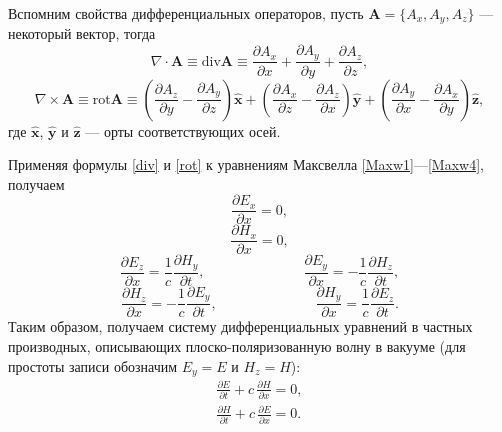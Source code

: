 \documentclass[12pt,a4paper]{article}
\begin{document}
	Вспомним свойства дифференциальных операторов, пусть $\mathbf{A} = \{A_x, A_y, A_z\}$ --- некоторый вектор, тогда
	\begin{equation}\label{div}
		\nabla \cdot \mathbf{A} \equiv \text{div}\mathbf{A} \equiv \frac{\partial A_x}{\partial x} + \frac{\partial A_y}{\partial y} + \frac{\partial A_z}{\partial z},
	\end{equation}
	\begin{equation}\label{rot}
		\nabla \times \mathbf{A} \equiv \text{rot}\mathbf{A} \equiv \left(\frac{\partial A_z}{\partial y} - \frac{\partial A_y}{\partial z}\right)\hat{\mathbf{x}} + \left(\frac{\partial A_x}{\partial z} - \frac{\partial A_z}{\partial x}\right)\hat{\mathbf{y}} + \left(\frac{\partial A_y}{\partial x} - \frac{\partial A_x}{\partial y}\right)\hat{\mathbf{z}},
	\end{equation}
	где $\hat{\mathbf{x}}$, $\hat{\mathbf{y}}$ и $\hat{\mathbf{z}}$ --- орты соответствующих осей.
	
	Применяя формулы \eqref{div} и \eqref{rot} к уравнениям Максвелла \eqref{Maxw1}---\eqref{Maxw4}, получаем
	\begin{equation}
		\frac{\partial E_x}{\partial x} = 0,
	\end{equation}
	\begin{equation}
		\frac{\partial H_x}{\partial x} = 0,
	\end{equation}
	\begin{equation}
		\frac{\partial E_z}{\partial x} = \frac{1}{c}\frac{\partial H_y}{\partial t}, \hspace{7em} \frac{\partial E_y}{\partial x} = -\frac{1}{c}\frac{\partial H_z}{\partial t},
	\end{equation}
	\begin{equation}
		\frac{\partial H_z}{\partial x} = -\frac{1}{c}\frac{\partial E_y}{\partial t}, \hspace{7em} \frac{\partial H_y}{\partial x} = \frac{1}{c}\frac{\partial E_z}{\partial t}.
	\end{equation}
	Таким образом, получаем систему дифференциальных уравнений в частных производных, описывающих плоско-поляризованную волну в вакууме (для простоты записи обозначим $E_y = E$ и $H_z = H$):
	\begin{align}
		\frac{\partial E}{\partial t} + c\,\frac{\partial H}{\partial x} = 0,\label{pEM_wave1}\\
		\frac{\partial H}{\partial t} + c\,\frac{\partial E}{\partial x} = 0.\label{pEM_wave2}
	\end{align}
	
\end{document}
